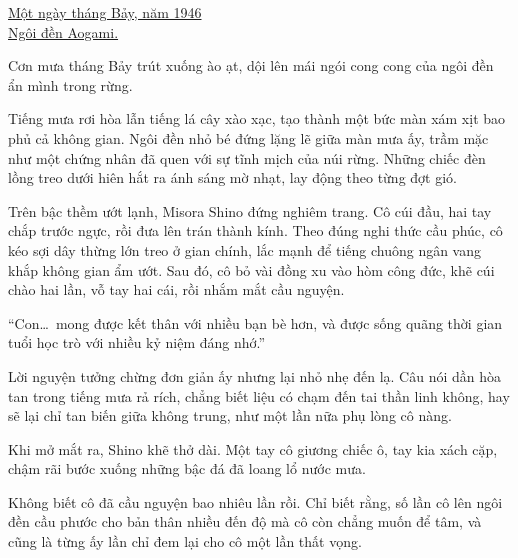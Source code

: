 \documentclass[../main.tex]{subfiles}
\begin{document}

\begin{center}
  \uline{Một ngày tháng Bảy, năm 1946\\Ngôi đền Aogami.}
\end{center}

Cơn mưa tháng Bảy trút xuống ào ạt, dội lên mái ngói cong cong của ngôi đền ẩn mình trong rừng.

Tiếng mưa rơi hòa lẫn tiếng lá cây xào xạc, tạo thành một bức màn xám xịt bao phủ cả không gian. Ngôi đền nhỏ bé đứng lặng lẽ giữa màn mưa ấy, trầm mặc như một chứng nhân đã quen với sự tĩnh mịch của núi rừng. Những chiếc đèn lồng treo dưới hiên hắt ra ánh sáng mờ nhạt, lay động theo từng đợt gió.

Trên bậc thềm ướt lạnh, Misora Shino đứng nghiêm trang. Cô cúi đầu, hai tay chắp trước ngực, rồi đưa lên trán thành kính. Theo đúng nghi thức cầu phúc, cô kéo sợi dây thừng lớn treo ở gian chính, lắc mạnh để tiếng chuông ngân vang khắp không gian ẩm ướt. Sau đó, cô bỏ vài đồng xu vào hòm công đức, khẽ cúi chào hai lần, vỗ tay hai cái, rồi nhắm mắt cầu nguyện.


``Con\dots\ mong được kết thân với nhiều bạn bè hơn, và được sống quãng thời gian tuổi học trò với nhiều kỷ niệm đáng nhớ.''

Lời nguyện tưởng chừng đơn giản ấy nhưng lại nhỏ nhẹ đến lạ. Câu nói dần hòa tan trong tiếng mưa rả rích, chẳng biết liệu có chạm đến tai thần linh không, hay sẽ lại chỉ tan biến giữa không trung, như một lần nữa phụ lòng cô nàng.

Khi mở mắt ra, Shino khẽ thở dài. Một tay cô giương chiếc ô, tay kia xách cặp, chậm rãi bước xuống những bậc đá đã loang lổ nước mưa.

Không biết cô đã cầu nguyện bao nhiêu lần rồi. Chỉ biết rằng, số lần cô lên ngôi đền cầu phước cho bản thân nhiều đến độ mà cô còn chẳng muốn để tâm, và cũng là từng ấy lần chỉ đem lại cho cô một lần thất vọng.
\end{document}
